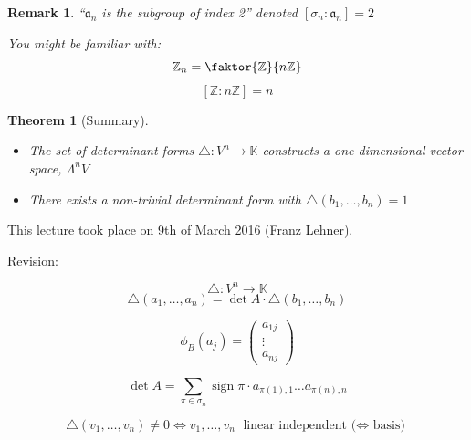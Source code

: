 \documentclass[a4paper,landscape,twocolumn]{article}
\newcommand\meta[3]{This #1 took place on #2 (#3).\par}
\newtheorem{theorem}{Theorem}
\newtheorem{rem}{Remark}
\DeclareMathOperator\sign{sign}
\begin{document}
\begin{rem}
  \enquote{$\mathfrak a_n$ is the subgroup of index 2}
  denoted $[\sigma_n: \mathfrak a_n] = 2$

  You might be familiar with:
  \[ \mathbb Z_n = \faktor{\mathbb Z}{n \mathbb Z} \]
  \[ [\mathbb Z : n \mathbb Z] = n \]
\end{rem}

\begin{theorem}[Summary]
  \label{summary-7.24}
  \begin{itemize}
    \item The set of determinant forms $\triangle: V^n \to \mathbb K$
      constructs a one-dimensional vector space, $\Lambda^n V$
    \item There exists a non-trivial determinant form with $\triangle(b_1,\ldots,b_n) = 1$
  \end{itemize}
\end{theorem}

\meta{lecture}{9th of March 2016}{Franz Lehner}

Revision:

\[ \triangle: V^n \to \mathbb K \]
\[ \triangle(a_1, \ldots, a_n) = \det{A} \cdot \triangle(b_1, \ldots, b_n) \]

\[ \phi_B(a_j) = \begin{pmatrix} a_{1j} \\ \vdots \\ a_{nj} \end{pmatrix} \]

\[ \det{A} = \sum_{\pi \in \sigma_n} \sign{\pi} \cdot a_{\pi(1),1} \ldots a_{\pi(n),n} \]

\[ \triangle(v_1, \ldots, v_n) \neq 0 \Leftrightarrow v_1, \ldots, v_n \text{ linear independent ($\Leftrightarrow$ basis)} \]
\end{document}
